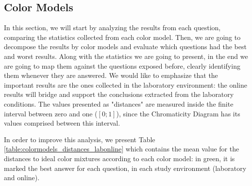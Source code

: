 \subsection{Color Models}
\label{subsec:results_colormodels}
%
In this section, we will start by analyzing the results from each question, comparing the statistics collected from each color model. Then, we are going to decompose the results by color models and evaluate which questions
had the best and worst results. Along with the statistics we are going to present, in the end we are going to map them against the questions exposed before, clearly identifying them whenever they are answered. We would like
to emphasize that the important results are the ones collected in the laboratory environment: the online results will bridge and support the conclusions extracted from the laboratory conditions. The values presented as "distances"
are measured inside the finite interval between zero and one ($[0 ; 1]$), since the Chromaticity Diagram has its values comprised between this interval. \par
%
In order to improve this analysis, we present Table \ref{table:colormodels_distances_labonline} which contains the mean value for the distances to ideal color mixtures according to each color model: in green, it is marked the
best answer for each question, in each study environment (laboratory and online). \par
%

